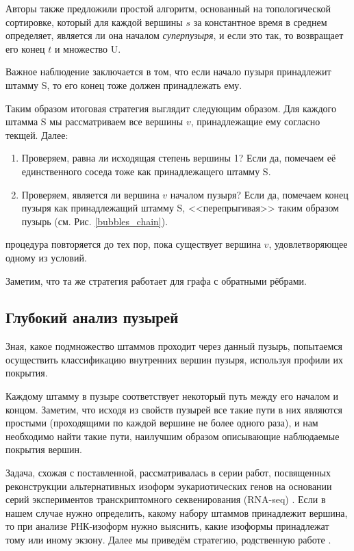 \documentclass{spbau-diploma}
\begin{document}
Авторы \cite{superbubbles} также предложили простой алгоритм, основанный на топологической сортировке, который для каждой вершины $s$ за константное время в среднем определяет, является ли она началом \textit{суперпузыря}, и если это так, то возвращает его конец $t$ и множество U.

Важное наблюдение заключается в том, что если начало пузыря принадлежит штамму S, то его конец тоже должен принадлежать ему. 

Таким образом итоговая стратегия выглядит следующим образом.
Для каждого штамма S мы рассматриваем все вершины $v$, принадлежащие ему согласно текщей. Далее:
\begin{enumerate}
    \item Проверяем, равна ли исходящая степень вершины 1? Если да, помечаем её единственного соседа тоже как принадлежащего штамму S.
    \item Проверяем, является ли вершина $v$ началом пузыря? Если да, помечаем конец пузыря как принадлежащий штамму S, <<перепрыгивая>> таким образом пузырь (см. Рис. \ref{bubbles_chain}).
\end{enumerate}
процедура повторяется до тех пор, пока существует вершина $v$, удовлетворяющее одному из условий.

Заметим, что та же стратегия работает для графа с обратными рёбрами.

\subsection{Глубокий анализ пузырей}

Зная, какое подмножество штаммов проходит через данный пузырь, попытаемся осуществить классификацию внутренних вершин пузыря, используя профили их покрытия.

Каждому штамму в пузыре соответствует некоторый путь между его началом и концом. Заметим, что исходя из свойств пузырей все такие пути в них являются простыми (проходящими по каждой вершине не более одного раза), и нам необходимо найти такие пути, наилучшим образом описывающие наблюдаемые покрытия вершин.

Задача, схожая с поставленной, рассматривалась в серии работ, посвященных реконструкции альтернативных изоформ эукариотических генов на основании серий экспериментов транскриптомного секвенирования (RNA-seq) \cite{flipflop2, other_flows, flipflop1, isolasso}. Если в нашем случае нужно определить, какому набору штаммов принадлежит вершина, то при анализе РНК-изоформ нужно выяснить, какие изоформы принадлежат тому или иному экзону. Далее мы приведём стратегию, родственную работе \cite{isolasso}.
\end{document}
